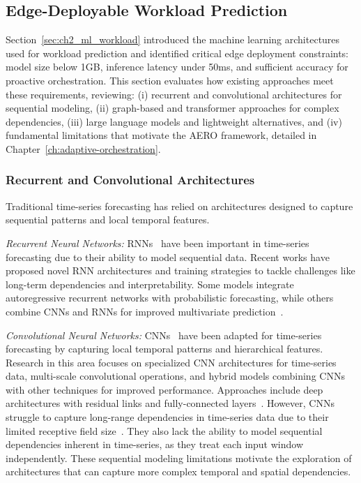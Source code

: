 \subsection{Edge-Deployable Workload Prediction}
\label{sec:ch2_sota_aero}

Section~\ref{sec:ch2_ml_workload} introduced the machine learning architectures used for workload prediction and identified critical edge deployment constraints: model size below 1\ac{GB}, inference latency under 50ms, and sufficient accuracy for proactive orchestration. This section evaluates how existing approaches meet these requirements, reviewing: (i) recurrent and convolutional architectures for sequential modeling, (ii) graph-based and transformer approaches for complex dependencies, (iii) large language models and lightweight alternatives, and (iv) fundamental limitations that motivate the \ac{AERO} framework, detailed in Chapter~\ref{ch:adaptive-orchestration}.

\subsubsection{Recurrent and Convolutional Architectures}

Traditional time-series forecasting has relied on architectures designed to capture sequential patterns and local temporal features.

\textit{Recurrent Neural Networks:} \acp{RNN}~\cite{lai2018modelinglongshorttermtemporal, Jhin_2024, li2023learningpolarrepresentationextremeadaptive} have been important in time-series forecasting due to their ability to model sequential data. Recent works have proposed novel \ac{RNN} architectures and training strategies to tackle challenges like long-term dependencies and interpretability. Some models integrate autoregressive recurrent networks with probabilistic forecasting, while others combine \acp{CNN} and \acp{RNN} for improved multivariate prediction~\cite{li2024evogwp}.

\textit{Convolutional Neural Networks:} \acp{CNN}~\cite{wang2023micn} have been adapted for time-series forecasting by capturing local temporal patterns and hierarchical features. Research in this area focuses on specialized \ac{CNN} architectures for time-series data, multi-scale convolutional operations, and hybrid models combining \acp{CNN} with other techniques for improved performance. Approaches include deep architectures with residual links and fully-connected layers~\cite{donghao2024moderntcn}. However, \acp{CNN} struggle to capture long-range dependencies in time-series data due to their limited receptive field size~\cite{wu2023timesnettemporal2dvariationmodeling}. They also lack the ability to model sequential dependencies inherent in time-series, as they treat each input window independently. These sequential modeling limitations motivate the exploration of architectures that can capture more complex temporal and spatial dependencies.

